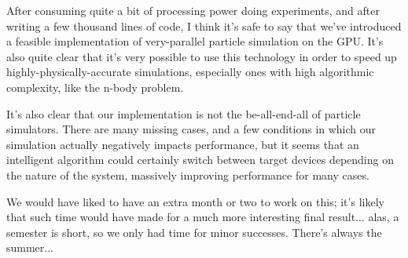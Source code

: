 \documentclass{acmsiggraph}
\begin{document}
After consuming quite a bit of processing power doing experiments, and after writing a few thousand lines of code, I think it's safe to say that we've introduced a feasible implementation of very-parallel particle simulation on the GPU. It's also quite clear that it's very possible to use this technology in order to speed up highly-physically-accurate simulations, especially ones with high algorithmic complexity, like the n-body problem.

It's also clear that our implementation is not the be-all-end-all of particle simulators. There are many missing cases, and a few conditions in which our simulation actually negatively impacts performance, but it seems that an intelligent algorithm could certainly switch between target devices depending on the nature of the system, massively improving performance for many cases.

We would have liked to have an extra month or two to work on this; it's likely that such time would have made for a much more interesting final result... alas, a semester is short, so we only had time for minor successes. There's always the summer...


\nocite{*}

\end{document}
